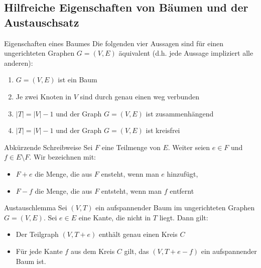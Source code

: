 \documentclass{panikzettel}
\newcommand{\boxspace}{	\vspace{-\baselineskip}	}
\begin{document}
\subsection{Hilfreiche Eigenschaften von Bäumen und der Austauschsatz}

\begin{theo}{Eigenschaften eines Baumes}
	Die folgenden vier Aussagen sind für einen ungerichteten Graphen $G= (V,E)$ äquivalent (d.h. jede Aussage impliziert alle anderen):

	\begin{enumerate}
		\item $G=(V,E)$ ist ein Baum
		\item Je zwei Knoten in $V$ sind durch genau einen weg verbunden
		\item $|T| = |V| - 1$ und der Graph $G = (V,E)$ ist zusammenhängend
		\item $|T| = |V| - 1$ und der Graph $G = (V,E)$ ist kreisfrei
	\end{enumerate}
\end{theo}

\begin{halfboxl}
	\boxspace
	
	\begin{defi}{Abkürzende Schreibweise}
		Sei $F$ eine Teilmenge von $E$. Weiter seien $e \in F$ und $f \in E\setminus F$. Wir bezeichnen mit:
		
		\begin{itemize}
			\item $F + e$ die Menge, die aus $F$ ensteht, wenn man $e$ hinzufügt,
			\item $F -f$ die Menge, die aus $F$ entsteht, wenn man $f$ entfernt
		\end{itemize}
		
	\end{defi}
	
\end{halfboxl}%
\begin{halfboxr}
	\boxspace
	
	\begin{defi}{Austauschlemma}
		Sei $(V,T)$ ein aufspannender Baum im ungerichteten Graphen $G = (V,E)$. Sei $e \in E$ eine Kante, die nicht in $T$ liegt. Dann gilt:
		
		\begin{itemize}
			\item Der Teilgraph $(V,T+e)$ enthält genau einen Kreis $C$
			\item Für jede Kante $f$ aus dem Kreis $C$ gilt, das $(V,T+e-f)$ ein aufspannender Baum ist.
		\end{itemize}
	\end{defi}
	
\end{halfboxr}
\end{document}
